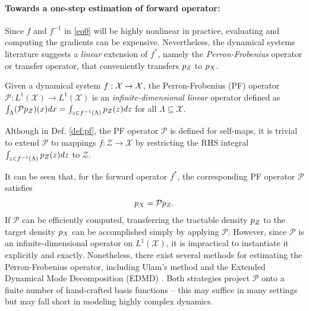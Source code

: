 \paragraph{Towards a one-step estimation of forward operator:} Since $f$ and ${f}^{-1}$ in \eqref{eq0} will be highly nonlinear in practice, evaluating and computing the gradients can be expensive. Nevertheless, the dynamical systems literature suggests a {\em linear} extension of $f^*$, namely the \textit{Perron-Frobenius} operator or transfer operator, that conveniently transfers $p_{\var{z}}$ to $p_{\var{x}}$.
\begin{definition}
\label{def:pf}
Given a dynamical system $f: \mathcal{X} \to \mathcal{X}$, the Perron-Frobenius (PF) operator $\mathcal{P}: L^1(\mathcal{X}) \rightarrow L^1(\mathcal{X})$ is an \textit{infinite-dimensional linear} operator defined as $\int_\Lambda (\mathcal{P}p_{\var{z}})(x) dx = \int_{z \in {f^{-1}(\Lambda)}}p_{\var{z}}(z)dz$ for all $\Lambda \subseteq \mathcal{X}.$
\end{definition}

Although in Def. \ref{def:pf}, the PF operator $\mathcal{P}$ is defined for self-maps, it is trivial to extend $\mathcal{P}$ to mappings $f: \mathcal{Z} \to \mathcal{X}$ by restricting the RHS integral $\int_{z \in {f^{-1}(\Lambda)}}p_{\var{z}}(z)dz$ to $\mathcal{Z}$.

It can be seen that, for the forward operator $f^*$,  the corresponding PF operator $\mathcal{P}$ satisfies
\begin{align}
\label{eq1}
p_{\var{x}} = \mathcal{P}p_{\var{z}}. 
\end{align}
If $\mathcal{P}$ can be efficiently computed, transferring the tractable density $p_{\var{z}}$ to the target density $p_{\var{x}}$ can be accomplished simply by applying $\mathcal{P}$. 
However, since $\mathcal{P}$ is an infinite-dimensional operator on $L^1(\mathcal{X})$, it is impractical to instantiate it explicitly and exactly. 
Nonetheless, there exist several methods for estimating the Perron-Frobenius operator, including Ulam's method \citep{ulam1960collection} and the Extended Dynamical Mode Decomposition (EDMD) \citep{williams2015data}.
Both strategies project $\mathcal{P}$ onto a finite number of hand-crafted basis functions -- this may suffice 
in many settings but may fall short in modeling highly complex dynamics. 


